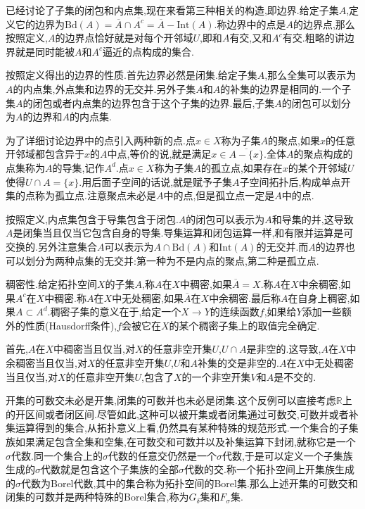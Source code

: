已经讨论了子集的闭包和内点集,现在来看第三种相关的构造,即边界.给定子集$A$,定义它的边界为$\mathrm{Bd}(A)=\overline{A}\cap\overline{A^c}=\overline{A}-\mathrm{Int}(A)$.称边界中的点是$A$的边界点,那么按照定义,$A$的边界点恰好就是对每个开邻域$U$,即和$A$有交,又和$A^c$有交.粗略的讲边界就是同时能被$A$和$A^c$逼近的点构成的集合.

按照定义得出的边界的性质.首先边界必然是闭集.给定子集$A$,那么全集可以表示为$A$的内点集,外点集和边界的无交并.另外子集$A$和$A$的补集的边界是相同的.一个子集$A$的闭包或者内点集的边界包含于这个子集的边界.最后,子集$A$的闭包可以划分为$A$的边界和$A$的内点集.

为了详细讨论边界中的点引入两种新的点.点$x\in X$称为子集$A$的聚点,如果$x$的任意开邻域都包含异于$x$的$A$中点,等价的说,就是满足$x\in\overline{A-\{x\}}$.全体$A$的聚点构成的点集称为$A$的导集,记作$A^d$.点$x\in X$称为子集$A$的孤立点,如果存在$x$的某个开邻域$U$使得$U\cap A=\{x\}$.用后面子空间的话说,就是赋予子集$A$子空间拓扑后,构成单点开集的点称为孤立点.注意聚点未必是$A$中的点,但是孤立点一定是$A$中的点.

按照定义,内点集包含于导集包含于闭包.$A$的闭包可以表示为$A$和导集的并,这导致$A$是闭集当且仅当它包含自身的导集.导集运算和闭包运算一样,和有限并运算是可交换的.另外注意集合$A$可以表示为$A\cap\mathrm{Bd}(A)$和$\mathrm{Int}(A)$的无交并.而$A$的边界也可以划分为两种点集的无交并:第一种为不是内点的聚点,第二种是孤立点.

稠密性.给定拓扑空间$X$的子集$A$,称$A$在$X$中稠密,如果$\overline{A}=X$.称$A$在$X$中余稠密,如果$A^c$在$X$中稠密.称$A$在$X$中无处稠密,如果$\overline{A}$在$X$中余稠密.最后称$A$在自身上稠密,如果$A\subset A^d$.稠密子集的意义在于,给定一个$X\to Y$的连续函数$f$,如果给$Y$添加一些额外的性质(Hausdorff条件),$f$会被它在$X$的某个稠密子集上的取值完全确定.

首先,$A$在$X$中稠密当且仅当,对$X$的任意非空开集$U$,$U\cap A$是非空的.这导致,$A$在$X$中余稠密当且仅当,对$X$的任意非空开集$U$,$U$和$A$补集的交是非空的.$A$在$X$中无处稠密当且仅当,对$X$的任意非空开集$U$,包含了$X$的一个非空开集$V$和$A$是不交的.

开集的可数交未必是开集,闭集的可数并也未必是闭集.这个反例可以直接考虑$\mathbb{R}$上的开区间或者闭区间.尽管如此,这种可以被开集或者闭集通过可数交,可数并或者补集运算得到的集合,从拓扑意义上看,仍然具有某种特殊的规范形式.一个集合的子集族如果满足包含全集和空集,在可数交和可数并以及补集运算下封闭,就称它是一个$\sigma$代数.同一个集合上的$\sigma$代数的任意交仍然是一个$\sigma$代数,于是可以定义一个子集族生成的$\sigma$代数就是包含这个子集族的全部$\sigma$代数的交.称一个拓扑空间上开集族生成的$\sigma$代数为Borel代数,其中的集合称为拓扑空间的Borel集.那么上述开集的可数交和闭集的可数并是两种特殊的Borel集合,称为$G_{\delta}$集和$F_{\sigma}$集.

